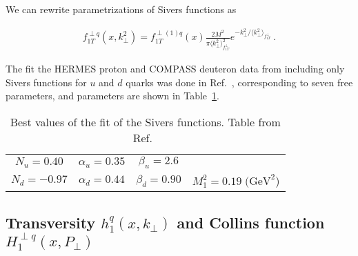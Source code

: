 \documentclass[a4paper,11pt]{article}
\newcommand{\ba}{\begin{eqnarray}}
\newcommand{\ea}{\end{eqnarray}}
\newcommand{\la}{\langle}
\newcommand{\ra}{\rangle}
\def\kperp{k_\perp}
\def\avkperp{\la \kperp^2 \ra}
\begin{document}
We can rewrite parametrizations of Sivers functions as

\ba
f_{1T}^{\perp q}(x,\kperp^2) =  f_{1T}^{\perp (1) q}(x)   \frac{2 M^2}{\pi \avkperp_{f_{1T}^\perp}^2} e^{-\kperp^2/{\avkperp_{f_{1T}^\perp}}}
\label{sivers_new} \ .
\ea

The fit the HERMES proton and COMPASS deuteron data from 
including only Sivers functions for $u$ and $d$ quarks was done in Ref.~\cite{Anselmino:2011gs},
corresponding to seven free parameters, and parameters are shown in Table~\ref{tab:a}.


\begin{table}
\centering
\begin{tabular}{cccc}
\hline
$N_u=0.40$ & $\alpha_u=0.35$ & $\beta_u=2.6$ & \\
$N_d=-0.97$ & $\alpha_d=0.44$ & $\beta_d=0.90$ & $M_1^2=0.19\;\textrm{(GeV}^2$)\\
\hline
\end{tabular}
	\caption{Best values of the fit of the Sivers functions. 
	Table from Ref.~\cite{Anselmino:2011gs}}
\label{tab:a}
\end{table}



\subsection{\boldmath Transversity $h_{1}^{q}(x,k_\perp)$ and 
Collins function $H_{1}^{\perp q}(x,P_\perp)$}
\label{App:basis-h1-H1perp}
\end{document}

